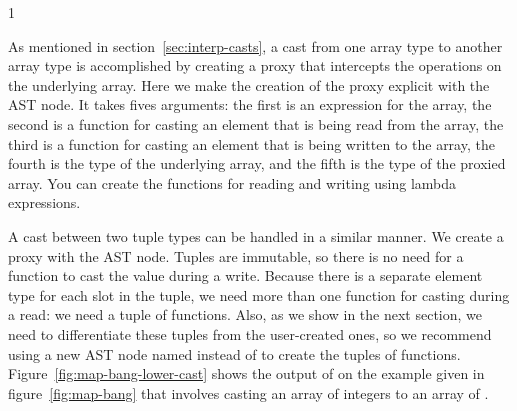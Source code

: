\documentclass[7x10]{TimesAPriori_MIT}%
\def\pythonEd{1}
\def\edition{1}
\newcommand{\pythonColor}[0]{}
\numberwithin{theorem}{chapter}
\numberwithin{definition}{chapter}
\numberwithin{equation}{chapter}
\begin{document}
{\if\edition\pythonEd\pythonColor

As mentioned in section~\ref{sec:interp-casts}, a cast from one array
type to another array type is accomplished by creating a proxy that
intercepts the operations on the underlying array. Here we make the
creation of the proxy explicit with the  AST node. It
takes fives arguments: the first is an expression for the array, the
second is a function for casting an element that is being read from
the array, the third is a function for casting an element that is
being written to the array, the fourth is the type of the underlying
array, and the fifth is the type of the proxied array.  You can create
the functions for reading and writing using lambda expressions.

A cast between two tuple types can be handled in a similar manner.  We
create a proxy with the  AST node.  Tuples are
immutable, so there is no need for a function to cast the value during
a write.  Because there is a separate element type for each slot in
the tuple, we need more than one function for casting during a read:
we need a tuple of functions.
%
Also, as we show in the next section, we need to differentiate these
tuples from the user-created ones, so we recommend using a new AST
node named  instead of  to create the
tuples of functions.
%
Figure~\ref{fig:map-bang-lower-cast} shows the output of
 on the example given in figure~\ref{fig:map-bang}
that involves casting an array of integers to an array of \CANYTY{}.

\fi}
\end{document}
